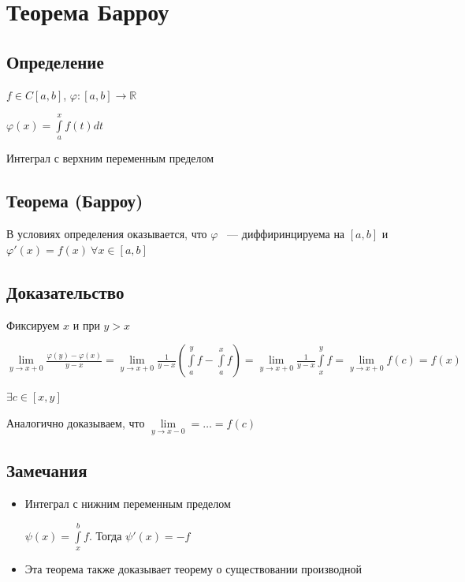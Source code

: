 \documentclass{article}
\begin{document}
	\section{Теорема Барроу}
	
		\subsection{Определение}
		
			$f \in C[a, b]$, $\varphi : [a, b] \rightarrow \mathbb{R}$
		
			$\varphi (x) = \int\limits^x_a f(t)dt$
		
			Интеграл с верхним переменным пределом
		
		\subsection{Теорема (Барроу)}
		
			В условиях определения оказывается, что $\varphi$ ~--- диффиринцируема на $[a, b]$ и $\varphi'(x) = f(x) \ \forall x \in [a, b]$
		
		\subsection{Доказательство}
		
			Фиксируем $x$ и при $y > x$
		
			$\lim\limits_{y \rightarrow x + 0} \frac{\varphi(y) - \varphi(x)}{y - x} = \lim\limits_{y \rightarrow x + 0} \frac{1}{y - x} ( \int\limits^y_a f - \int\limits^x_a f) = \lim\limits_{y \rightarrow x + 0} \frac{1}{y - x} \int\limits^y_x f = \lim\limits_{y \rightarrow x + 0} f(c) = f(x)$
		
			$\exists c \in [x, y]$
		
			Аналогично доказываем, что $\lim\limits_{y \rightarrow x - 0} = \ldots = f(c)$
		
		\subsection{Замечания}
		
			\begin{itemize}
			
				\item Интеграл с нижним переменным пределом
				
					$\psi(x) = \int\limits^b_x f$. Тогда $\psi'(x) = -f$
					
				\item Эта теорема также доказывает теорему о существовании производной
				
			\end{itemize}
			
\end{document}
